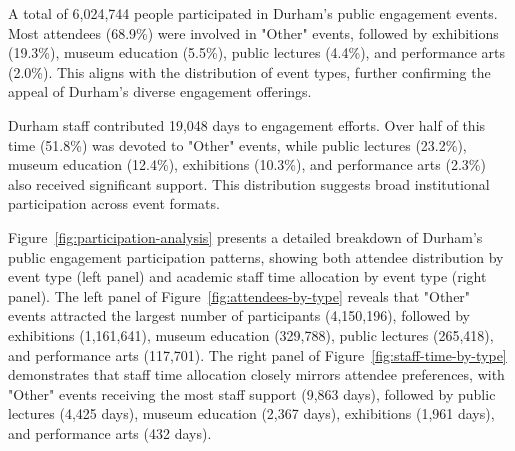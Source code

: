 \documentclass[journal,onecolumn, 10pt,draftclsnofoot]{IEEEtran}
\begin{document}
A total of 6,024,744 people participated in Durham's public engagement events. Most attendees (68.9\%) were involved in "Other" events, followed by exhibitions (19.3\%), museum education (5.5\%), public lectures (4.4\%), and performance arts (2.0\%). This aligns with the distribution of event types, further confirming the appeal of Durham's diverse engagement offerings.

Durham staff contributed 19,048 days to engagement efforts. Over half of this time (51.8\%) was devoted to "Other" events, while public lectures (23.2\%), museum education (12.4\%), exhibitions (10.3\%), and performance arts (2.3\%) also received significant support. This distribution suggests broad institutional participation across event formats.

Figure~\ref{fig:participation-analysis} presents a detailed breakdown of Durham's public engagement participation patterns, showing both attendee distribution by event type (left panel) and academic staff time allocation by event type (right panel). The left panel of Figure~\ref{fig:attendees-by-type} reveals that "Other" events attracted the largest number of participants (4,150,196), followed by exhibitions (1,161,641), museum education (329,788), public lectures (265,418), and performance arts (117,701). The right panel of Figure~\ref{fig:staff-time-by-type} demonstrates that staff time allocation closely mirrors attendee preferences, with "Other" events receiving the most staff support (9,863 days), followed by public lectures (4,425 days), museum education (2,367 days), exhibitions (1,961 days), and performance arts (432 days).
\end{document}
